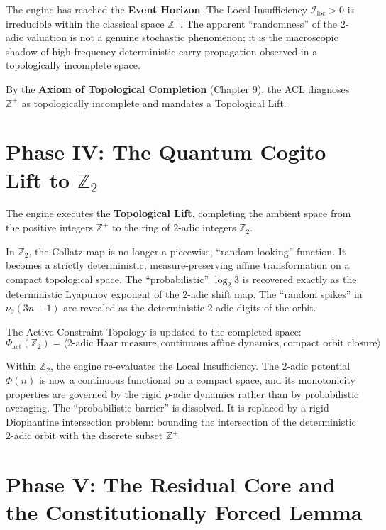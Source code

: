 \documentclass[12pt,openany]{extbook}
\theoremstyle{plain}
\theoremstyle{definition}
\begin{document}
The engine has reached the \textbf{Event Horizon}. The Local Insufficiency $\mathcal{I}_{\mathrm{loc}} > 0$ is irreducible within the classical space $\mathbb{Z}^+$. The apparent ``randomness'' of the $2$-adic valuation is not a genuine stochastic phenomenon; it is the macroscopic shadow of high-frequency deterministic carry propagation observed in a topologically incomplete space.

By the \textbf{Axiom of Topological Completion} (Chapter 9), the ACL diagnoses $\mathbb{Z}^+$ as topologically incomplete and mandates a Topological Lift.

\section{Phase IV: The Quantum Cogito Lift to $\mathbb{Z}_2$}

The engine executes the \textbf{Topological Lift}, completing the ambient space from the positive integers $\mathbb{Z}^+$ to the ring of $2$-adic integers $\mathbb{Z}_2$.

In $\mathbb{Z}_2$, the Collatz map is no longer a piecewise, ``random-looking'' function. It becomes a strictly deterministic, measure-preserving affine transformation on a compact topological space. The ``probabilistic'' $\log_2 3$ is recovered exactly as the deterministic Lyapunov exponent of the $2$-adic shift map. The ``random spikes'' in $\nu_2(3n+1)$ are revealed as the deterministic $2$-adic digits of the orbit.

The Active Constraint Topology is updated to the completed space:
\[
\Phi_{\mathrm{act}}(\mathbb{Z}_2) = \langle \text{$2$-adic Haar measure}, \text{continuous affine dynamics}, \text{compact orbit closure} \rangle
\]

Within $\mathbb{Z}_2$, the engine re-evaluates the Local Insufficiency. The $2$-adic potential $\Phi(n)$ is now a continuous functional on a compact space, and its monotonicity properties are governed by the rigid $p$-adic dynamics rather than by probabilistic averaging. The ``probabilistic barrier'' is dissolved. It is replaced by a rigid Diophantine intersection problem: bounding the intersection of the deterministic $2$-adic orbit with the discrete subset $\mathbb{Z}^+$.

\section{Phase V: The Residual Core and the Constitutionally Forced Lemma}
\end{document}
